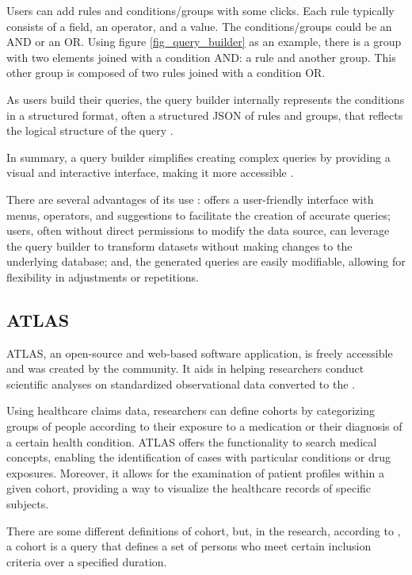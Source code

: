 Users can add rules and conditions/groups with some clicks. Each rule typically consists of a field, an operator, and a value. The conditions/groups could be an AND or an OR. Using figure \ref{fig_query_builder} as an example, there is a group with two elements joined with a condition AND: a rule and another group. This other group is composed of two rules joined with a condition OR.

As users build their queries, the query builder internally represents the conditions in a structured format, often a structured JSON of rules and groups, that reflects the logical structure of the query \cite{noauthor_jquery_nodate}.

In summary, a query builder simplifies creating complex queries by providing a visual and interactive interface, making it more accessible \cite{noauthor_introducing_2021}.

There are several advantages of its use \cite{noauthor_introducing_2021}: offers a user-friendly interface with menus, operators, and suggestions to facilitate the creation of accurate queries; users, often without direct permissions to modify the data source, can leverage the query builder to transform datasets without making changes to the underlying database; and, the generated queries are easily modifiable, allowing for flexibility in adjustments or repetitions.


\subsection{ATLAS}
\label{atlas}


ATLAS, an open-source and web-based software application, is freely accessible and was created by the {\ohdsi} community. It aids in helping researchers conduct scientific analyses on standardized observational data converted to the {\omop}.

Using healthcare claims data, researchers can define cohorts by categorizing groups of people according to their exposure to a medication or their diagnosis of a certain health condition. ATLAS offers the functionality to search medical concepts, enabling the identification of cases with particular conditions or drug exposures. Moreover, it allows for the examination of patient profiles within a given cohort, providing a way to visualize the healthcare records of specific subjects.

There are some different definitions of cohort, but, in the {\ohdsi} research, according to \citet{informatics_chapter_nodate}, a cohort is a query that defines a set of persons who meet certain inclusion criteria over a specified duration.

